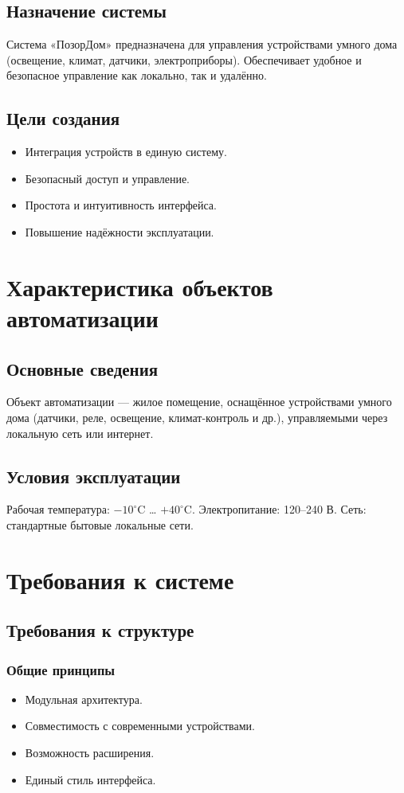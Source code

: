 \documentclass[oneside,a4paper,14pt]{extarticle}
\begin{document}
\subsection{Назначение системы}
Система «ПозорДом» предназначена для управления устройствами умного дома (освещение, климат, датчики, электроприборы). Обеспечивает удобное и безопасное управление как локально, так и удалённо.

\subsection{Цели создания}
\begin{itemize}
    \item Интеграция устройств в единую систему.
    \item Безопасный доступ и управление.
    \item Простота и интуитивность интерфейса.
    \item Повышение надёжности эксплуатации.
\end{itemize}

\section{Характеристика объектов автоматизации}

\subsection{Основные сведения}
Объект автоматизации — жилое помещение, оснащённое устройствами умного дома (датчики, реле, освещение, климат-контроль и др.), управляемыми через локальную сеть или интернет.

\subsection{Условия эксплуатации}
Рабочая температура: $-10^\circ$C … $+40^\circ$C.  
Электропитание: 120–240 В.  
Сеть: стандартные бытовые локальные сети.

\section{Требования к системе}

\subsection{Требования к структуре}

\subsubsection{Общие принципы}
\begin{itemize}
    \item Модульная архитектура.
    \item Совместимость с современными устройствами.
    \item Возможность расширения.
    \item Единый стиль интерфейса.
\end{itemize}
\end{document}
